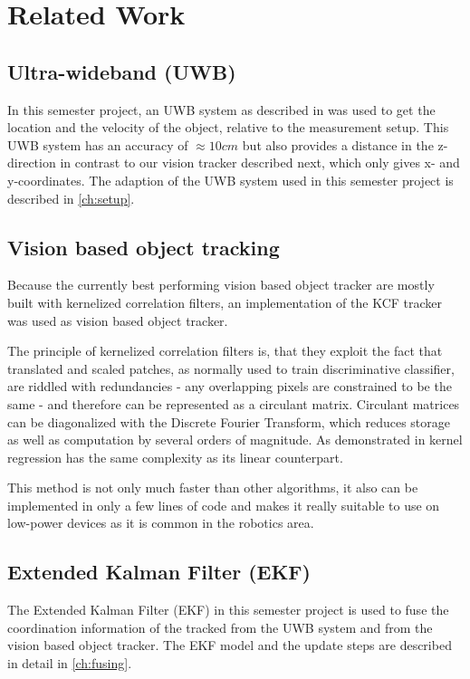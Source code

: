 
\setcounter{chapter}{1}

\chapter{Related Work}

\section{Ultra-wideband (UWB)}
In this semester project, an UWB system as described in   was used to get the location and the velocity of the object, relative to the measurement setup. This UWB system has an accuracy of $\approx 10 cm$ but also provides a distance in the z-direction in contrast to our vision tracker described next, which only gives x- and y-coordinates. The adaption of the UWB system used in this semester project is described in \autoref{ch:setup}.

\section{Vision based object tracking}
Because the currently best performing vision based object tracker are mostly built with kernelized correlation filters, an implementation of the KCF tracker \cite{henriques2015tracking} was used as vision based object tracker.

The principle of kernelized correlation filters is, that they exploit the fact that translated and scaled patches, as normally used to train discriminative classifier, are riddled with redundancies - any overlapping pixels are constrained to be the same - and therefore can be represented as a circulant matrix. Circulant matrices can be diagonalized with the Discrete Fourier Transform, which reduces storage as well as computation by several orders of magnitude. As demonstrated in \cite{henriques2015tracking} kernel regression has the same complexity as its linear counterpart.

This method is not only much faster than other algorithms, it also can be implemented in only a few lines of code and makes it really suitable to use on low-power devices as it is common in the robotics area.

\section{Extended Kalman Filter (EKF)}
The Extended Kalman Filter (EKF)  in this semester project is used to fuse the coordination information of the tracked from the UWB system and from the vision based object tracker. The EKF model and the update steps are described in detail in \autoref{ch:fusing}.